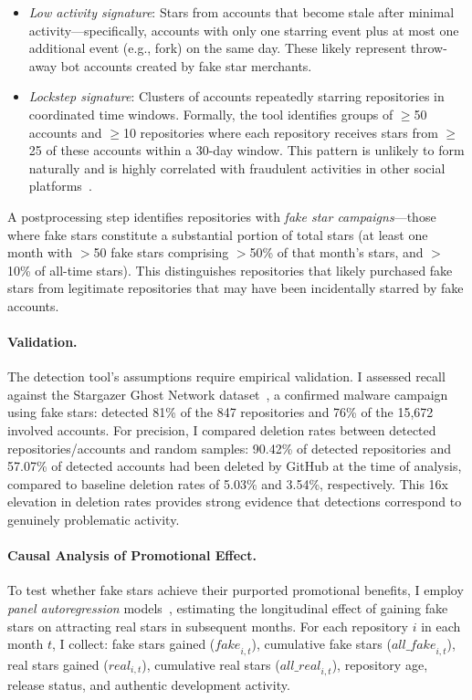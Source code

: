 \begin{itemize}[leftmargin=15pt]
    \item \emph{Low activity signature}: Stars from accounts that become stale after minimal activity---specifically, accounts with only one starring event plus at most one additional event (e.g., fork) on the same day.
    These likely represent throw-away bot accounts created by fake star merchants.
    
    \item \emph{Lockstep signature}: Clusters of accounts repeatedly starring repositories in coordinated time windows.
    Formally, the tool identifies groups of $\geq$50 accounts and $\geq$10 repositories where each repository receives stars from $\geq$25 of these accounts within a 30-day window.
    This pattern is unlikely to form naturally and is highly correlated with fraudulent activities in other social platforms~\cite{DBLP:conf/www/BeutelXGPF13}.
\end{itemize}

A postprocessing step identifies repositories with \emph{fake star campaigns}---those where fake stars constitute a substantial portion of total stars (at least one month with $>$50 fake stars comprising $>$50\% of that month's stars, and $>$10\% of all-time stars).
This distinguishes repositories that likely purchased fake stars from legitimate repositories that may have been incidentally starred by fake accounts.

\paragraph{Validation.}
The detection tool's assumptions require empirical validation.
I assessed recall against the Stargazer Ghost Network dataset~\cite{stargazer-goblin}, a confirmed malware campaign using fake stars: \SystemName detected 81\% of the 847 repositories and 76\% of the 15,672 involved accounts.
For precision, I compared deletion rates between detected repositories/accounts and random samples: 90.42\% of detected repositories and 57.07\% of detected accounts had been deleted by GitHub at the time of analysis, compared to baseline deletion rates of 5.03\% and 3.54\%, respectively.
This 16x elevation in deletion rates provides strong evidence that detections correspond to genuinely problematic activity.

\paragraph{Causal Analysis of Promotional Effect.}
To test whether fake stars achieve their purported promotional benefits, I employ \emph{panel autoregression} models~\cite{hanck2021introduction}, estimating the longitudinal effect of gaining fake stars on attracting real stars in subsequent months.
For each repository $i$ in each month $t$, I collect: fake stars gained ($\textit{fake}_{i,t}$), cumulative fake stars ($\textit{all\_fake}_{i,t}$), real stars gained ($\textit{real}_{i,t}$), cumulative real stars ($\textit{all\_real}_{i,t}$), repository age, release status, and authentic development activity.

